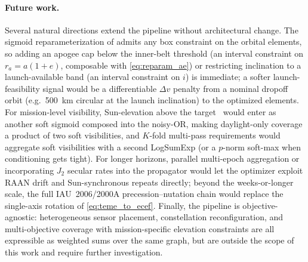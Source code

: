\paragraph{Future work.}
Several natural directions extend the pipeline without architectural change. The sigmoid reparameterization of  admits any box constraint on the orbital elements, so adding an apogee cap below the inner-belt threshold (an interval constraint on $r_a = a(1+e)$, composable with \eqref{eq:reparam_ae}) or restricting inclination to a launch-available band (an interval constraint on $i$) is immediate; a softer launch-feasibility signal would be a differentiable $\Delta v$ penalty from a nominal dropoff orbit (e.g.\ \SI{500}{\kilo\metre} circular at the launch inclination) to the optimized elements. For mission-level visibility, Sun-elevation above the target~\citep{vallado_fundamentals_2022} would enter as another soft sigmoid composed into the noisy-OR, making daylight-only coverage a product of two soft visibilities, and $K$-fold multi-pass requirements would aggregate soft visibilities with a second LogSumExp (or a $p$-norm soft-max when conditioning gets tight). For longer horizons, parallel multi-epoch aggregation or incorporating $J_2$ secular rates into the propagator would let the optimizer exploit RAAN drift and Sun-synchronous repeats directly; beyond the weeks-or-longer scale, the full IAU~2006/2000A precession--nutation chain would replace the single-axis rotation of \eqref{eq:teme_to_ecef}. Finally, the pipeline is objective-agnostic: heterogeneous sensor placement, constellation reconfiguration, and multi-objective coverage with mission-specific elevation constraints are all expressible as weighted sums over the same graph, but are outside the scope of this work and require further investigation.
